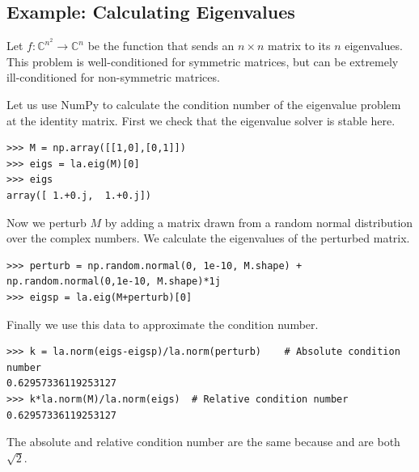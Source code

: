 
\subsection*{Example: Calculating Eigenvalues}
Let $f:\mathbb{C}^{n^2} \rightarrow \mathbb{C}^n$ be the function that sends an $n \times n$ matrix to its $n$ eigenvalues.
This problem is well-conditioned for symmetric matrices, but can be extremely ill-conditioned for non-symmetric matrices.

Let us use NumPy to calculate the condition number of the eigenvalue problem at the identity matrix.
First we check that the eigenvalue solver is stable here.
\begin{lstlisting}
>>> M = np.array([[1,0],[0,1]])
>>> eigs = la.eig(M)[0]
>>> eigs
array([ 1.+0.j,  1.+0.j])
\end{lstlisting}
Now we perturb $M$ by adding a matrix drawn from a random normal distribution over the complex numbers.
We calculate the eigenvalues of the perturbed matrix.
\begin{lstlisting}
>>> perturb = np.random.normal(0, 1e-10, M.shape) + np.random.normal(0,1e-10, M.shape)*1j
>>> eigsp = la.eig(M+perturb)[0]
\end{lstlisting}
Finally we use this data to approximate the condition number.
\begin{lstlisting}
>>> k = la.norm(eigs-eigsp)/la.norm(perturb)	# Absolute condition number
0.62957336119253127
>>> k*la.norm(M)/la.norm(eigs)	# Relative condition number
0.62957336119253127
\end{lstlisting}
The absolute and relative condition number are the same because  and  are both $\sqrt{2}$.


